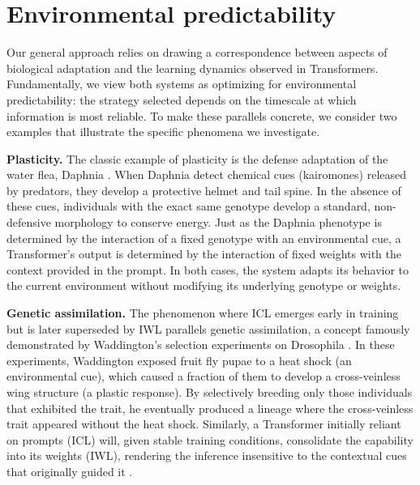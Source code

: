\section{Environmental predictability}

Our general approach relies on drawing a correspondence between aspects of biological adaptation and the learning dynamics observed in Transformers. Fundamentally, we view both systems as optimizing for environmental predictability: the strategy selected depends on the timescale at which information is most reliable. To make these parallels concrete, we consider two examples that illustrate the specific phenomena we investigate.


\textbf{Plasticity.} The classic example of plasticity is the defense adaptation of the water flea, Daphnia \cite{tollrian1999ecology}. When Daphnia detect chemical cues (kairomones) released by predators, they develop a protective helmet and tail spine. In the absence of these cues, individuals with the exact same genotype develop a standard, non-defensive morphology to conserve energy.
Just as the Daphnia phenotype is determined by the interaction of a fixed genotype with an environmental cue, a Transformer’s output is determined by the interaction of fixed weights with the context provided in the prompt. In both cases, the system adapts its behavior to the current environment without modifying its underlying genotype or weights.

\textbf{Genetic assimilation.} The phenomenon where ICL emerges early in training but is later superseded by IWL parallels genetic assimilation, a concept famously demonstrated by Waddington’s selection experiments on Drosophila \cite{waddington1953genetic}. In these experiments, Waddington exposed fruit fly pupae to a heat shock (an environmental cue), which caused a fraction of them to develop a cross-veinless wing structure (a plastic response). By selectively breeding only those individuals that exhibited the trait, he eventually produced a lineage where the cross-veinless trait appeared without the heat shock.
Similarly, a Transformer initially reliant on prompts (ICL) will, given stable training conditions, consolidate the capability into its weights (IWL), rendering the inference insensitive to the contextual cues that originally guided it \cite{singh2023transient}.


